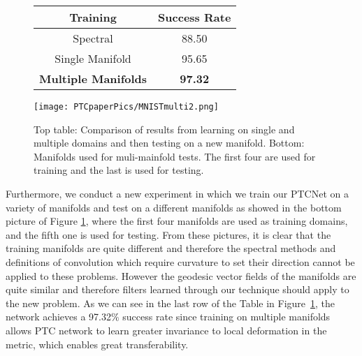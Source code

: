 \documentclass[10pt,twocolumn,letterpaper]{article}
\begin{document}
\begin{figure}[htp]
\begin{center}
  \begin{tabular}{ |c | c | }
  \hline
 Training      &  Success Rate  \\ \hline
 Spectral      & 88.50        \\ \hline
 Single Manifold     & 95.65  \\ \hline
 \textbf{Multiple Manifolds} & \textbf{97.32} \\ \hline
  \end{tabular}
\end{center}
\centering
\texttt{[image: PTCpaperPics/MNISTmulti2.png]}
\caption{Top table: Comparison of results from learning on single and multiple domains and then testing on a new manifold. Bottom: Manifolds used for muli-mainfold tests. The first four are used for training and the last is used for testing.  }
\label{fig:MultiMNIST}
\end{figure}


Furthermore, we conduct a new experiment in which we train our PTCNet on a variety of manifolds and test on a different manifolds as showed in the bottom picture of Figure \ref{fig:MultiMNIST}, where the first four manifolds are used as training domains, and the fifth one is used for testing. From these pictures, it is clear that the training manifolds are quite different and therefore the spectral methods and definitions of convolution which require curvature to set their direction \cite{boscaini2016learning} cannot be applied to these problems. However the geodesic vector fields  of the manifolds are quite similar and therefore filters learned through our technique should apply to the new problem. As we can see in the last row of the Table in Figure~\ref{fig:MultiMNIST}, the network achieves a 97.32$\%$ success rate since training on multiple manifolds allows PTC network to learn greater invariance to local deformation in the metric, which enables great transferability.
\end{document}
